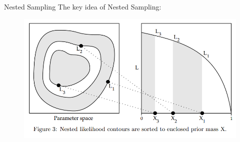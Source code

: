 \begin{frame}[t]{Nested Sampling}
The key idea of Nested Sampling: 

\begin{figure}
\begin{center}
\includegraphics[scale=0.4]{ns.png}
\end{center}
\end{figure}


\end{frame}



